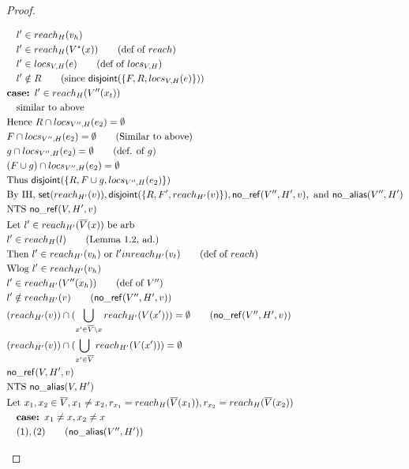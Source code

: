\documentclass[11pt]{article}
\newcommand{\ms}[1]{\ensuremath{\mathsf{#1}}}
\newcommand{\na}[1]{\mathsf{no\_alias}(#1)}
\newcommand{\nr}[1]{\mathsf{no\_ref}(#1)}
\newcommand{\dist}[1]{\mathsf{disjoint}(#1)}
\begin{document}
\begin{proof}
\begin{description}
\begin{align*}
  &\quad l' \in reach_{H}(v_h)\\
  &\quad l' \in reach_{H}(V^{\star}(x)) \tag{def of $reach$}\\
  &\quad l' \in locs_{V,H}(e) \tag{def of $locs_{V,H}$}\\
  &\quad l' \notin R \tag{since $\dist{\{F,R,locs_{V,H}(e)\}}$}\\
  &\textbf{case: }  l' \in reach_{H}(V''(x_t)) \\
  &\quad \text{similar to above}\\
  &\text{Hence } R \cap locs_{V'',H}(e_2) = \emptyset\\
  &F \cap locs_{V'',H}(e_2) = \emptyset \tag{Similar to above}\\
  &g \cap locs_{V'',H}(e_2) = \emptyset \tag{def. of $g$}\\
  &(F \cup g) \cap locs_{V'',H}(e_2) = \emptyset\\
  &\text{Thus } \dist{\{R,F \cup g,locs_{V'',H}(e_2)\}}\\
  &\text{By IH, } \ms{set}(reach_{H'}(v)), \dist{\{R,F',reach_{H'}(v)\}}, \nr{V'',H',v}, \text{ and } \na{V'',H'}\\
  &\text{NTS } \nr{V,H',v}\\
  &\text{Let } l' \in reach_{H'}(\overline V(x)) \text{ be arb }\\
  &l' \in reach_H(l) \tag{Lemma 1.2, ad.}\\
  &\text{Then } l' \in reach_{H'}(v_h) \text{ or } l' in reach_{H'}(v_t) \tag{def of $reach$}\\
  &\text{Wlog } l' \in reach_{H'}(v_h)\\
  &l' \in reach_{H'}(V''(x_h)) \tag{def of $V''$}\\
  &l' \notin reach_{H'}(v) \tag{$\nr{V'',H',v}$}\\
  &(reach_{H'}(v)) \cap (\bigcup_{x' \in \overline V \setminus x} reach_{H'}(V(x'))) = \emptyset \tag{$\nr{V'',H',v}$}\\
  &(reach_{H'}(v)) \cap (\bigcup_{x' \in \overline V} reach_{H'}(V(x'))) = \emptyset\\
  &\nr{V,H',v}\\
  &\text{NTS } \na{V,H'}\\
  &\text{Let } x_1, x_2 \in \overline V, x_1 \ne x_2, r_{x_1} = reach_H(\overline V(x_1)), r_{x_2} = reach_H(\overline V(x_2))\\
  &\quad \textbf{case: } x_1 \ne x, x_2 \ne x\\
  &\quad (1), (2) \tag{$\na{V'',H'}$}\\

\end{align*}
\end{description}
\end{proof}
\end{document}
